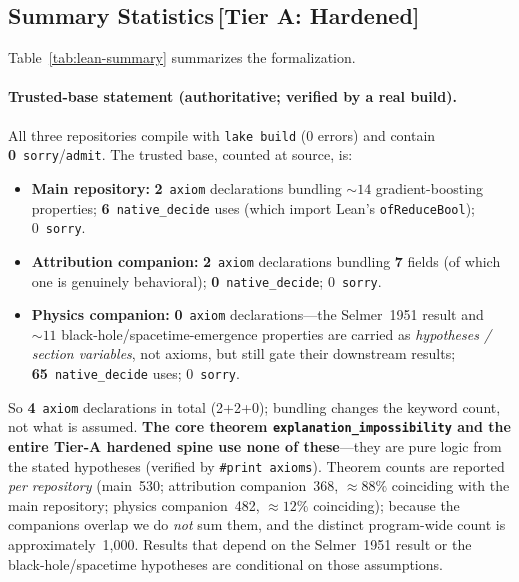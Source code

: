 \documentclass[11pt,a4paper]{article}
\begin{document}
\subsection{Summary Statistics\,\textnormal{\normalsize[Tier A: Hardened]}}

Table~\ref{tab:lean-summary} summarizes the formalization.

\paragraph{Trusted-base statement (authoritative; verified by a real build).}
All three repositories compile with \texttt{lake build} (0 errors) and contain
\textbf{0}~\texttt{sorry}/\texttt{admit}. The trusted base, counted at source, is:
\begin{itemize}\itemsep2pt
  \item \textbf{Main repository:} \textbf{2}~\texttt{axiom} declarations bundling ${\sim}14$
    gradient-boosting properties; \textbf{6}~\texttt{native\_decide} uses (which import Lean's
    \texttt{ofReduceBool}); 0~\texttt{sorry}.
  \item \textbf{Attribution companion:} \textbf{2}~\texttt{axiom} declarations bundling
    \textbf{7} fields (of which one is genuinely behavioral); \textbf{0}~\texttt{native\_decide};
    0~\texttt{sorry}.
  \item \textbf{Physics companion:} \textbf{0}~\texttt{axiom} declarations---the Selmer~1951
    result and ${\sim}11$ black-hole/spacetime-emergence properties are carried as
    \emph{hypotheses / section variables}, not axioms, but still gate their downstream results;
    \textbf{65}~\texttt{native\_decide} uses; 0~\texttt{sorry}.
\end{itemize}
So \textbf{4}~\texttt{axiom} declarations in total (2+2+0); bundling changes the keyword count,
not what is assumed. \textbf{The core theorem \texttt{explanation\_impossibility} and the entire
Tier-A hardened spine use none of these}---they are pure logic from the stated hypotheses (verified
by \texttt{\#print axioms}). Theorem counts are reported \emph{per repository} (main~530;
attribution companion~368, ${\approx}88\%$ coinciding with the main repository; physics
companion~482, ${\approx}12\%$ coinciding); because the companions overlap we do \emph{not} sum
them, and the distinct program-wide count is approximately~1{,}000. Results that depend on the
Selmer~1951 result or the black-hole/spacetime hypotheses are conditional on those assumptions.
\end{document}
